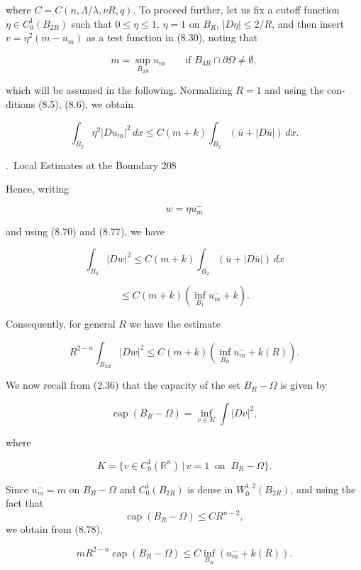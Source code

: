 \noindent where $C=C(n,\Lambda/\lambda,\nu R,q)$. To proceed further, let us fix a cutoff function
$\eta \in C_0^1(B_{2R})$ such that $0\le \eta \le 1$, $\eta=1$ on $B_R$, $|D\eta|\le 2/R$, and then insert
$v=\eta^2(m-u_m)$ as a test function in (8.30), noting that

\[
m=\sup_{B_{2R}} u_m \qquad \text{if } B_{4R}\cap \partial\Omega \ne \emptyset,
\]

\noindent which will be assumed in the following. Normalizing $R=1$ and using the con-
ditions (8.5), (8.6), we obtain

\[
\int_{B_2} \eta^2 |Du_m|^2\,dx \le C(m+k)\int_{B_2} (\bar u + |D\bar u|)\,dx.
\]

\providecommand{\osc}{\operatorname{osc}}
\providecommand{\chi}{\operatorname{\chi}}

\setcounter{section}{8}
\setcounter{subsection}{10}
.\ Local Estimates at the Boundary \hfill 208

\medskip

Hence, writing

\[
w=\eta u_m^-
\]

and using (8.70) and (8.77), we have

\[
\int_{B_2}|Dw|^2\le C(m+k)\int_{B_2}(\bar u+|D\bar u|)\,dx
\]

\[
\le C(m+k)\left(\inf_{B_1}u_m^-+k\right).
\]

Consequently, for general $R$ we have the estimate

\begin{equation}
\tag{8.78}
R^{2-n}\int_{B_{2R}}|Dw|^2\le C(m+k)\left(\inf_{B_R}u_m^-+k(R)\right).
\end{equation}

We now recall from (2.36) that the capacity of the set $B_R-\Omega$ is given by

\begin{equation}
\tag{8.79}
\operatorname{cap}(B_R-\Omega)=\inf_{v\in K}\int |Dv|^2,
\end{equation}

where

\[
K=\{v\in C_0^1(\mathbb{R}^n)\,|\, v=1\ \text{ on }\ B_R-\Omega\}.
\]

Since $u_m^-=m$ on $B_R-\Omega$ and $C_0^1(B_{2R})$ is dense in $W_0^{1,2}(B_{2R})$, and using the fact that
\[
\operatorname{cap}(B_R-\Omega)\le CR^{n-2},
\]
we obtain from (8.78),

\begin{equation}
\tag{8.80}
mR^{2-n}\operatorname{cap}(B_R-\Omega)\le C\inf_{B_R}(u_m^-+k(R)).
\end{equation}

